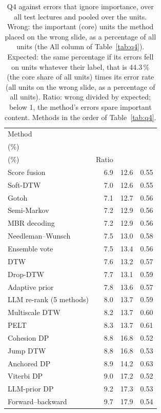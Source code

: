 \begin{table}[t]
\centering
\setlength{\tabcolsep}{1em}
\caption{Q4 against errors that ignore importance, over all test lectures and pooled over the units. Wrong: the important (core) units the method placed on the wrong slide, as a percentage of all units (the All column of Table~\ref{tab:q4}). Expected: the same percentage if its errors fell on units whatever their label, that is 44.3\,\% (the core share of all units) times its error rate (all units on the wrong slide, as a percentage of all units). Ratio: wrong divided by expected; below 1, the method's errors spare important content. Methods in the order of Table~\ref{tab:q4}.}
\label{tab:q4-expected}
\begin{tabular*}{\linewidth}{@{\extracolsep{\fill}}lrrr@{}}
\toprule
Method & \begin{tabular}[b]{@{}r@{}}Wrong\\(\%)\end{tabular} & \begin{tabular}[b]{@{}r@{}}Expected\\(\%)\end{tabular} & Ratio \\
\midrule
Score fusion & 6.9 & 12.6 & 0.55 \\
Soft-DTW & 7.0 & 12.6 & 0.55 \\
Gotoh & 7.1 & 12.7 & 0.56 \\
Semi-Markov & 7.2 & 12.9 & 0.56 \\
MBR decoding & 7.2 & 12.9 & 0.56 \\
Needleman--Wunsch & 7.5 & 13.0 & 0.58 \\
Ensemble vote & 7.5 & 13.4 & 0.56 \\
DTW & 7.6 & 13.2 & 0.57 \\
Drop-DTW & 7.7 & 13.1 & 0.59 \\
Adaptive prior & 7.8 & 13.6 & 0.57 \\
LLM re-rank (5 methods) & 8.0 & 13.7 & 0.59 \\
Multiscale DTW & 8.2 & 13.7 & 0.60 \\
PELT & 8.3 & 13.7 & 0.61 \\
Cohesion DP & 8.8 & 16.8 & 0.52 \\
Jump DTW & 8.8 & 16.8 & 0.53 \\
Anchored DP & 8.9 & 14.2 & 0.63 \\
Viterbi DP & 9.0 & 17.2 & 0.52 \\
LLM-prior DP & 9.2 & 17.3 & 0.53 \\
Forward--backward & 9.7 & 17.9 & 0.54 \\

\end{tabular*}
\end{table}
